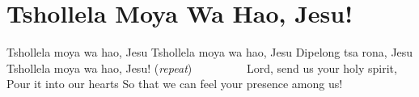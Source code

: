 \chapter{Tshollela Moya Wa Hao, Jesu!}
\starttocol
\startlines
T{\sc shollela} moya wa hao, Jesu
Tshollela moya wa hao, Jesu 
Dipelong tsa rona, Jesu
Tshollela moya wa hao, Jesu!    \hfill     ({\it repeat})~~~~~~~~~\hfill
\stoplines
\nexttocol
Lord, send us your holy spirit,
Pour it into our hearts
So that we can feel your presence among us!
\stoptocol
